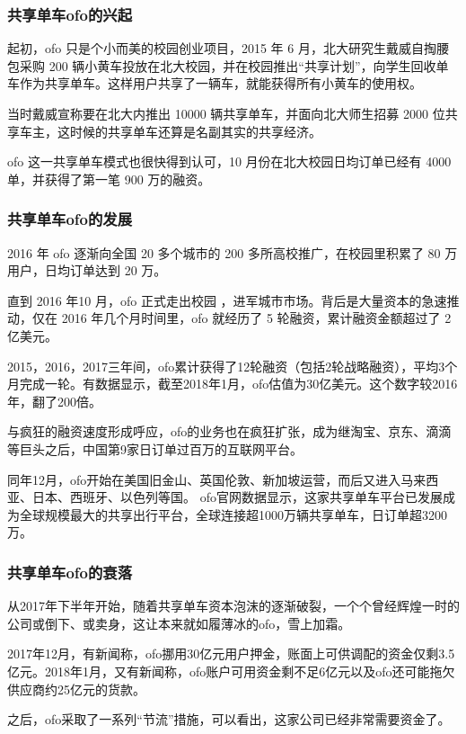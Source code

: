 \documentclass[a4paper,oneside,12pt]{article}
\begin{document}
\subsubsection{共享单车ofo的兴起}
起初，ofo 只是个小而美的校园创业项目，2015 年 6 月，北大研究生戴威自掏腰包采购 200 辆小黄车投放在北大校园，并在校园推出“共享计划”，向学生回收单车作为共享单车。这样用户共享了一辆车，就能获得所有小黄车的使用权。

当时戴威宣称要在北大内推出 10000 辆共享单车，并面向北大师生招募 2000 位共享车主，这时候的共享单车还算是名副其实的共享经济。

ofo 这一共享单车模式也很快得到认可，10 月份在北大校园日均订单已经有 4000 单，并获得了第一笔 900 万的融资。

\subsubsection{共享单车ofo的发展}
 2016 年 ofo 逐渐向全国 20 多个城市的 200 多所高校推广，在校园里积累了 80 万用户，日均订单达到 20 万。

直到 2016 年10 月，ofo 正式走出校园 ，进军城市市场。背后是大量资本的急速推动，仅在 2016 年几个月时间里，ofo 就经历了 5 轮融资，累计融资金额超过了 2 亿美元。

2015，2016，2017三年间，ofo累计获得了12轮融资（包括2轮战略融资），平均3个月完成一轮。有数据显示，截至2018年1月，ofo估值为30亿美元。这个数字较2016年，翻了200倍。

与疯狂的融资速度形成呼应，ofo的业务也在疯狂扩张，成为继淘宝、京东、滴滴等巨头之后，中国第9家日订单过百万的互联网平台。

同年12月，ofo开始在美国旧金山、英国伦敦、新加坡运营，而后又进入马来西亚、日本、西班牙、以色列等国。
ofo官网数据显示，这家共享单车平台已发展成为全球规模最大的共享出行平台，全球连接超1000万辆共享单车，日订单超3200万。

\subsubsection{共享单车ofo的衰落}

从2017年下半年开始，随着共享单车资本泡沫的逐渐破裂，一个个曾经辉煌一时的公司或倒下、或卖身，这让本来就如履薄冰的ofo，雪上加霜。

2017年12月，有新闻称，ofo挪用30亿元用户押金，账面上可供调配的资金仅剩3.5亿元。2018年1月，又有新闻称，ofo账户可用资金剩不足6亿元以及ofo还可能拖欠供应商约25亿元的货款。

之后，ofo采取了一系列“节流”措施，可以看出，这家公司已经非常需要资金了。
\end{document}

